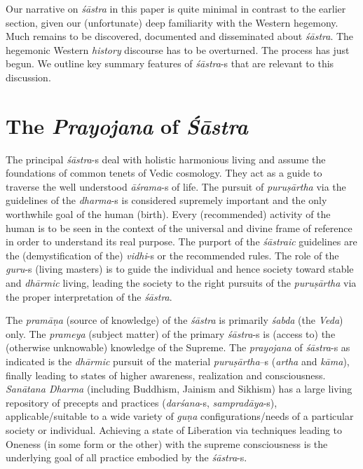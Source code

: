Our narrative on \textit{śāstra} in this paper is quite minimal in contrast to the earlier section, given our (unfortunate) deep familiarity with the Western hegemony. Much remains to be discovered, documented and disseminated about \textit{śāstra}. The hegemonic Western \textit{history} discourse has to be overturned. The process has just begun. We outline key summary features of \textit{śāstra}-s that are relevant to this discussion.


\section*{The \textit{Prayojana} of \textit{Śāstra}}

The principal \textit{śāstra}-s deal with holistic harmonious living and assume the foundations of common tenets of Vedic cosmology. They act as a guide to traverse the well understood \textit{āśrama}-s of life. The pursuit of \textit{puruṣārtha} via the guidelines of the \textit{dharma}-s is considered supremely important and the only worthwhile goal of the human (birth). Every (recommended) activity of the human is to be seen in the context of the universal and divine frame of reference in order to understand its real purpose. The purport of the \textit{śāstraic} guidelines are the (demystification of the) \textit{vidhi}-s or the recommended rules. The role of the \textit{guru}-s (living masters) is to guide the individual and hence society toward stable and \textit{dhārmic} living, leading the society to the right pursuits of the \textit{puruṣārtha} via the proper interpretation of the \textit{śāstra}.

\vskip 2pt

The \textit{pramāṇa} (source of knowledge) of the \textit{śāstra} is primarily \textit{śabda} (the \textit{Veda}) only. The \textit{prameya} (subject matter) of the primary \textit{śāstra}-s is (access to) the (otherwise unknowable) knowledge of the Supreme. The \textit{prayojana} of \textit{śāstra}-s as indicated is the \textit{dhārmic} pursuit of the material \textit{puruṣārtha}–s (\textit{artha} and \textit{kāma}), finally leading to states of higher awareness, realization and consciousness. \textit{Sanātana Dharma} (including Buddhism, Jainism and Sikhism) has a large living repository of precepts and practices (\textit{darśana}-s, \textit{sampradāya}-s), applicable/suitable to a wide variety of \textit{guṇa} configurations/needs of a particular society or individual. Achieving a state of Liberation via techniques leading to Oneness (in some form or the other) with the supreme consciousness is the underlying goal of all practice embodied by the \textit{śāstra}-s.

